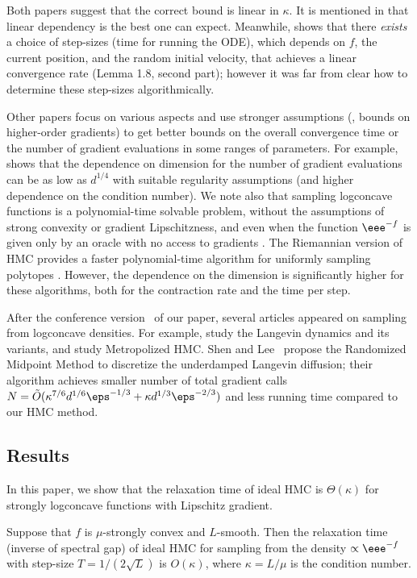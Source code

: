 Both papers suggest that the correct bound is linear in $\kappa$. 
It is mentioned in \cite{MS17} that linear dependency is the best one can expect. 
Meanwhile, \cite{LSV18} shows that there {\em exists} a choice of step-sizes (time for running the ODE), which depends on $f$, the current position, and the random initial velocity, that achieves a linear convergence rate (Lemma 1.8, second part); however it was far from clear how to determine these step-sizes algorithmically.  

Other papers focus on various aspects and use stronger assumptions (\eg, bounds on higher-order gradients) to get better bounds on the overall convergence time or the number of gradient evaluations in some ranges of parameters. For example, \cite{MV18} shows that the dependence on dimension for the number of gradient evaluations can be as low as $d^{1/4}$ with suitable regularity assumptions (and higher dependence on the condition number). We note also that sampling logconcave functions is a polynomial-time solvable problem, without the assumptions of strong convexity or gradient Lipschitzness, and even when the function $\eee^{-f}$ is given only by an oracle with no access to gradients \cite{AK91, LV06}. The Riemannian version of HMC provides a faster polynomial-time algorithm for uniformly sampling polytopes \cite{LV18}. However, the dependence on the dimension is significantly higher for these algorithms, both for the contraction rate and the time per step. 

After the %
conference version~\cite{conf-version}   %
of our paper, %
several articles appeared  %
%
on sampling from logconcave densities. 
For example, \cite{CLW19, DRK19, MMWBJ19, SL19, W19} study the 
Langevin dynamics and its variants, and \cite{CDWY19, LST20} 
study Metropolized HMC. 
%
%
%
Shen and Lee~\cite{SL19} propose the  %
Randomized Midpoint Method to discretize the underdamped Langevin diffusion; 
their algorithm achieves smaller number of total gradient calls
%
%
%
$N = \tilde{O}( \kappa^{7/6} d^{1/6} \eps^{-1/3}
 + \kappa d^{1/3} \eps^{-2/3} )$ 
and less running time compared to our HMC method. 
%
%
%
%

\subsection{Results}
In this paper, we show that the relaxation time of ideal HMC is $\Theta(\kappa)$ for strongly logconcave functions with Lipschitz gradient.  
\begin{theorem}\label{thm:rel_upper}
	Suppose that $f$ is $\mu$-strongly convex and $L$-smooth. Then the relaxation time (inverse of spectral gap) of ideal HMC for sampling from the density $\propto \eee^{-f}$ with step-size $T = 1/(2\sqrt{L})$ is $O(\kappa)$, 
	where $\kappa = L/\mu$ is the condition number. 
\end{theorem}

